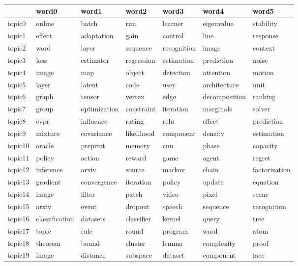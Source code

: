 \documentclass[letterpaper]{article}
\begin{document}
\begin{figure}[H]
  \begin{tabular}{l | l l l l l l}
    &     word0    &      word1 &          word2 &         word3 & word4 &        word5 \\ \hline
    topic0 & 	online & 	batch & 	rnn & 	learner & 	eigenvalue & 	stability \\
    topic1 & 	effect & 	adaptation & 	gain & 	control & 	line & 	response \\
    topic2 & 	word & 	layer & 	sequence & 	recognition & 	image & 	context \\
    topic3 & 	loss & 	estimator & 	regression & 	estimation & 	prediction & 	noise \\
    topic4 & 	image & 	map & 	object & 	detection & 	attention & 	motion \\
    topic5 & 	layer & 	latent & 	code & 	user & 	architecture & 	unit \\
    topic6 & 	graph & 	tensor & 	vertex & 	edge & 	decomposition & 	ranking \\
    topic7 & 	group & 	optimization & 	constraint & 	iteration & 	marginals & 	solver \\
    topic8 & 	cvpr & 	influence & 	rating & 	relu & 	effect & 	prediction \\
    topic9 & 	mixture & 	covariance & 	likelihood & 	component & 	density & 	estimation \\
    topic10 & 	oracle & 	preprint & 	memory & 	cnn & 	phase & 	capacity \\
    topic11 & 	policy & 	action & 	reward & 	game & 	agent & 	regret \\
    topic12 & 	inference & 	arxiv & 	source & 	markov & 	chain & 	factorization \\
    topic13 & 	gradient & 	convergence & 	iteration & 	policy & 	update & 	equation \\
    topic14 & 	image & 	filter & 	patch & 	video & 	pixel & 	scene \\
    topic15 & 	arxiv & 	event & 	dropout & 	speech & 	sequence & 	recognition \\
    topic16 & 	classification & 	datasets & 	classifier & 	kernel & 	query & 	tree \\
    topic17 & 	topic & 	rule & 	round & 	program & 	word & 	atom \\
    topic18 & 	theorem & 	bound & 	cluster & 	lemma & 	complexity & 	proof \\
    topic19 & 	image & 	distance & 	subspace & 	dataset & 	component & 	face \\

\end{tabular}
\end{figure}
\end{document}
